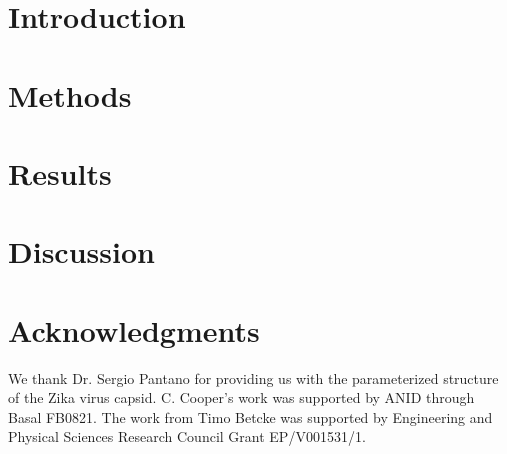 \documentclass[final,5p,times,twocolumn]{elsarticle}
\begin{document}
\section{Introduction}\label{sec:intro}


\section{Methods}\label{sec:methods}




\section{Results}\label{sec:results}


\section{Discussion} \label{sec:discussion}


\section*{Acknowledgments}
We thank Dr. Sergio Pantano for providing us with the parameterized structure of the Zika virus capsid.
C. Cooper’s work was supported by ANID through Basal FB0821.
The work from Timo Betcke was supported by Engineering and Physical Sciences Research Council Grant EP/V001531/1.

{}

\end{document}

